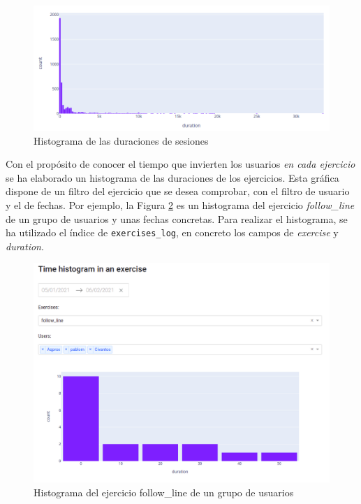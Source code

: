 \begin{figure}[H]
    \centering
    \includegraphics[width=15cm, keepaspectratio]{img/time_histogram.png}
    \caption{Histograma de las duraciones de sesiones}
    \label{fig:time_histogram}
\end{figure}
Con el propósito de conocer el tiempo que invierten los usuarios \textit{en cada ejercicio} se ha elaborado un histograma de las duraciones de los ejercicios. Esta gráfica dispone de un filtro del ejercicio que se desea comprobar, con el filtro de usuario y el de fechas. Por ejemplo, la Figura \ref{fig:histogram_exercise} es un histograma del ejercicio \textit{follow\_line}  de un grupo de usuarios y unas fechas concretas. Para realizar el histograma, se ha utilizado el índice de \texttt{exercises\_log}, en concreto los campos de \textit{exercise} y \textit{duration}.

\begin{figure}[H]
    \centering
    \includegraphics[width=17cm, keepaspectratio]{img/histogram_exercise.png}
    \caption{Histograma del ejercicio follow\_line de un grupo de usuarios }
    \label{fig:histogram_exercise}
\end{figure}

